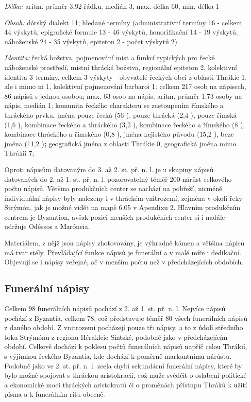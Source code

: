 {\em Délka:} aritm. průměr 3,92 řádku, medián 3, max. délka 60, min. délka 1

{\em Obsah:} dórský dialekt 11; hledané termíny (administrativní termíny 16 - celkem 44 výskytů, epigrafické formule 13 - 46 výskytů, honorifikační 14 - 19 výskytů, náboženské 24 - 35 výskytů, epiteton 2 - počet výskytů 2)

{\em Identita:} řecká božstva, pojmenování míst a funkcí typických pro řecké náboženské prostředí, místní thrácká božstva, regionální epiteton 2, kolektivní identita 3 termíny, celkem 3 výskyty - obyvatelé řeckých obcí z oblasti Thrákie 1, ale i mimo ni 1, kolektivní pojmenování barbaroi 1; celkem 217 osob na nápisech, 86 nápisů s jednou osobou; max. 63 osob na nápis, aritm. průměr 1,73 osoby na nápis, medián 1; komunita řeckého charakteru se zastoupením římského a thráckého prvku, jména pouze řecká (56 ), pouze thrácká (2,4 ), pouze římská (1,6 ), kombinace řeckého a thráckého (3,2 ), kombinace řeckého a římského (8 ), kombinace thráckého a římského (0,8 ), jména nejistého původu (15,2 ), beze jména (11,2 ){\bf ;} geografická jména z oblasti Thrákie 0, geografická jména mimo Thrákii 7;

\NC\AR
\HL
\HL
\stoptable

Oproti nápisům datovaným do 3. až 2. st. př. n. l. je u skupiny nápisů datovaných do 2. až 1. st. př. n. l. pozorovatelný téměř 200  nárůst celkového počtu nápisů. Většina produkčních center se nachází na pobřeží, nicméně individuální nápisy byly nalezeny i v thráckém vnitrozemí, zejména v okolí řeky Strýmón, jak je možné vidět na mapě 6.05 v Apendixu 2. Hlavním produkčním centrem je Byzantion, avšak pozici menších produkčních center si i nadále udržuje Odéssos a Maróneia.

Materiálem, z nějž jsou nápisy zhotovovány, je výhradně kámen a většina nápisů má tvar stély. Převládající funkce nápisů je funerální a v malé míře i dedikační. Objevují se i nápisy veřejné, ač v menším počtu než v předcházejících obdobích.

\subsection[funerální-nápisy-8]{Funerální nápisy}

Celkem 98 funerálních nápisů pochází z 2. až 1. st. př. n. l. Nejvíce nápisů pochází z Byzantia, celkem 78, což představuje téměř 80  všech funerálních nápisů z daného období. Z vnitrozemí pocházejí pouze tři nápisy, a to z údolí středního toku Strýmónu z regionu Hérakleie Sintské, podobně jako v předcházejícím období. Celkově dochází k poklesu počtů funerálních nápisů napříč celou Thrákií, s výjimkou řeckého Byzantia, kde dochází k poměrně markantnímu nárůstu. Podobně jako ve 2. st. př. n. l. zcela chybí sekundární funerální nápisy, které by bylo možné spojovat s thráckou aristokracií, což může svědčit o oslabení politické a ekonomické moci thráckých aristokratů či o proměnách přístupu Thráků k užití písma a k funerálním ritu obecně.

